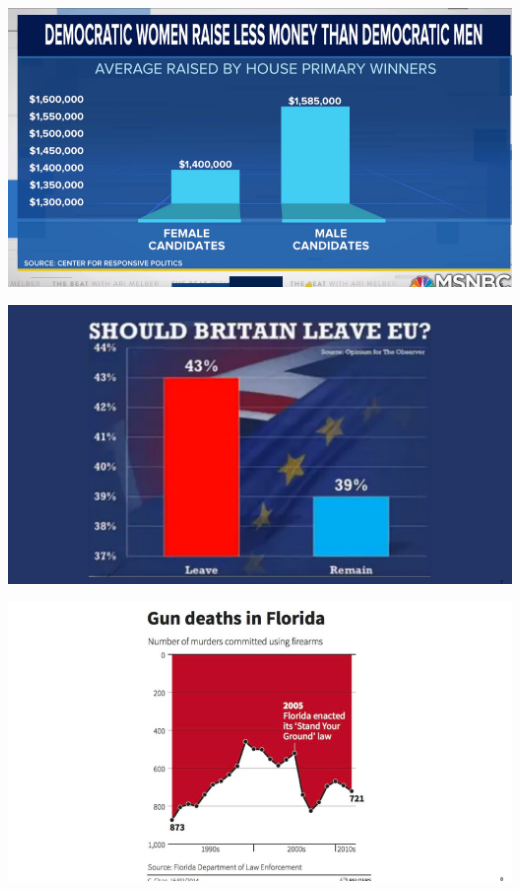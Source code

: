 \documentclass[
  ignorenonframetext,
]{beamer}
\begin{document}
\begin{frame}{}
\protect\hypertarget{section-1}{}
\includegraphics{hallofshame_figs/fig_6.png}
\end{frame}

\begin{frame}{}
\protect\hypertarget{section-2}{}
\includegraphics{hallofshame_figs/fig_7.png}
\end{frame}

\begin{frame}{}
\protect\hypertarget{section-3}{}
\includegraphics{hallofshame_figs/fig_8.png}
\end{frame}
\end{document}
